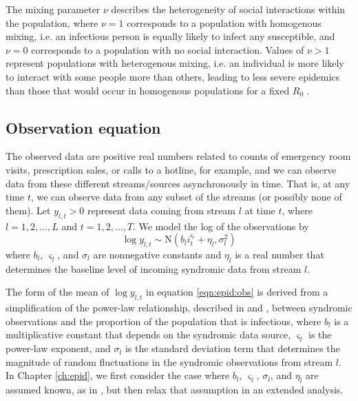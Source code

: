 The mixing parameter $\nu$ describes the heterogeneity of social interactions within the population, where $\nu = 1$ corresponds to a population with homogenous mixing, i.e. an infectious person is equally likely to infect any susceptible, and $\nu = 0$ corresponds to a population with no social interaction. Values of $\nu > 1$ represent populations with heterogenous mixing, i.e. an individual is more likely to interact with some people more than others, leading to less severe epidemics than those that would occur in homogenous populations for a fixed $R_0$ \citep{stroud2006powerlaw, novozhilov2008hetero}.

\subsection{Observation equation \label{sec:epid:obs}}

The observed data are positive real numbers related to counts of emergency room visits, prescription sales, or calls to a hotline, for example, and we can observe data from these different streams/sources asynchronously in time. That is, at any time $t$, we can observe data from any subset of the streams (or possibly none of them). Let $y_{l,t}>0$ represent data coming from stream $l$ at time $t$, where $l = 1,2,\ldots,L$ and $t = 1,2,\ldots,T$. We model the log of the observations by
\begin{equation}
\log y_{l,t} \sim \mbox{N}\left(b_li_t^{\varsigma_l} + \eta_l,\sigma_l^2\right) \label{eqn:epid:obs}
\end{equation}
where $b_l$, $\varsigma_l$, and $\sigma_l$ are nonnegative constants \citep{skvortsov2012monitoring} and $\eta_l$ is a real number that determines the baseline level of incoming syndromic data from stream $l$.

The form of the mean of $\log y_{l,t}$ in equation \eqref{eqn:epid:obs} is derived from a simplification of the power-law relationship, described in \citet{skvortsov2012monitoring} and \citet{Gins:Mohe:Pate:Bram:Smol:Bril:dete:2009}, between syndromic observations and the proportion of the population that is infectious, where $b_l$ is a multiplicative constant that depends on the syndromic data source, $\varsigma_l$ is the power-law exponent, and $\sigma_l$ is the standard deviation term that determines the magnitude of random fluctuations in the syndromic observations from stream $l$. In Chapter \ref{ch:epid}, we first consider the case where $b_l$, $\varsigma_l$, $\sigma_l$, and $\eta_l$ are assumed known, as in \citep{skvortsov2012monitoring}, but then relax that assumption in an extended analysis.

